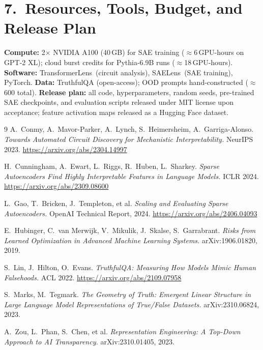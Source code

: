 \documentclass[11pt]{article}
\begin{document}
\section*{7.~Resources, Tools, Budget, and Release Plan}

\textbf{Compute:} 2$\times$ NVIDIA A100 (40\,GB) for SAE training ($\approx$6\,GPU-hours on GPT-2 XL); cloud burst credits for Pythia-6.9B runs ($\approx$18\,GPU-hours). \textbf{Software:} TransformerLens~(circuit analysis), SAELens~(SAE training), PyTorch. \textbf{Data:} TruthfulQA (open-access); OOD prompts hand-constructed ($\approx$600 total). \textbf{Release plan:} all code, hyperparameters, random seeds, pre-trained SAE checkpoints, and evaluation scripts released under MIT license upon acceptance; feature activation maps released as a Hugging Face dataset.

\begin{thebibliography}{9}
A.~Conmy, A.~Mavor-Parker, A.~Lynch, S.~Heimersheim, A.~Garriga-Alonso.
\textit{Towards Automated Circuit Discovery for Mechanistic Interpretability.}
NeurIPS 2023. \url{https://arxiv.org/abs/2304.14997}

H.~Cunningham, A.~Ewart, L.~Riggs, R.~Huben, L.~Sharkey.
\textit{Sparse Autoencoders Find Highly Interpretable Features in Language Models.}
ICLR 2024. \url{https://arxiv.org/abs/2309.08600}

L.~Gao, T.~Bricken, J.~Templeton, et al.
\textit{Scaling and Evaluating Sparse Autoencoders.}
OpenAI Technical Report, 2024. \url{https://arxiv.org/abs/2406.04093}

E.~Hubinger, C.~van Merwijk, V.~Mikulik, J.~Skalse, S.~Garrabrant.
\textit{Risks from Learned Optimization in Advanced Machine Learning Systems.}
arXiv:1906.01820, 2019.

S.~Lin, J.~Hilton, O.~Evans.
\textit{TruthfulQA: Measuring How Models Mimic Human Falsehoods.}
ACL 2022. \url{https://arxiv.org/abs/2109.07958}

S.~Marks, M.~Tegmark.
\textit{The Geometry of Truth: Emergent Linear Structure in Large Language Model Representations of True/False Datasets.}
arXiv:2310.06824, 2023.

A.~Zou, L.~Phan, S.~Chen, et al.
\textit{Representation Engineering: A Top-Down Approach to AI Transparency.}
arXiv:2310.01405, 2023.
\end{thebibliography}
\end{document}
